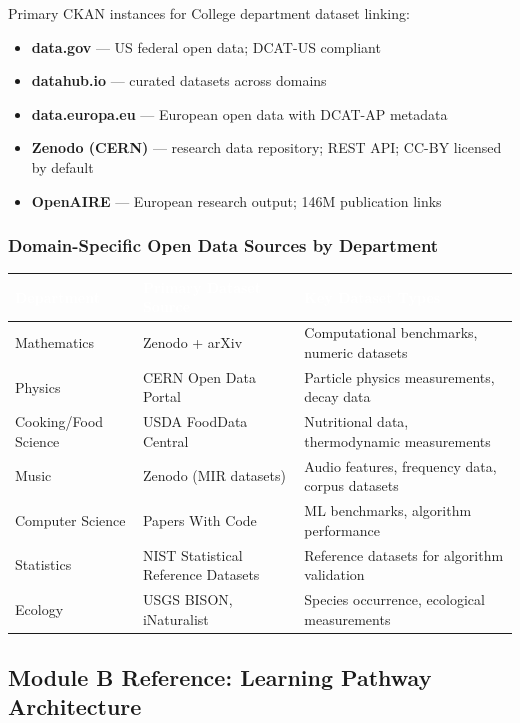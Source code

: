 \documentclass[11pt,letterpaper]{article}
\newcommand{\tableheader}[1]{\textbf{\sffamily\textcolor{white}{#1}}}
\begin{document}
Primary CKAN instances for College department dataset linking:
\begin{itemize}[noitemsep]
  \item \textbf{data.gov} --- US federal open data; DCAT-US compliant
  \item \textbf{datahub.io} --- curated datasets across domains
  \item \textbf{data.europa.eu} --- European open data with DCAT-AP metadata
  \item \textbf{Zenodo (CERN)} --- research data repository; REST API; CC-BY licensed by default
  \item \textbf{OpenAIRE} --- European research output; 146M publication links
\end{itemize}

\subsubsection{Domain-Specific Open Data Sources by Department}

\begin{center}
\begin{tabularx}{\textwidth}{L{3cm}L{4cm}X}
\toprule
{}
\tableheader{Department} & \tableheader{Primary Dataset Source} & \tableheader{Key Dataset Types} \\
\midrule
Mathematics & Zenodo + arXiv & Computational benchmarks, numeric datasets \\
Physics & CERN Open Data Portal & Particle physics measurements, decay data \\
Cooking/Food Science & USDA FoodData Central & Nutritional data, thermodynamic measurements \\
Music & Zenodo (MIR datasets) & Audio features, frequency data, corpus datasets \\
Computer Science & Papers With Code & ML benchmarks, algorithm performance \\
Statistics & NIST Statistical Reference Datasets & Reference datasets for algorithm validation \\
Ecology & USGS BISON, iNaturalist & Species occurrence, ecological measurements \\
\bottomrule
\end{tabularx}
\end{center}

\subsection{Module B Reference: Learning Pathway Architecture}
\end{document}
